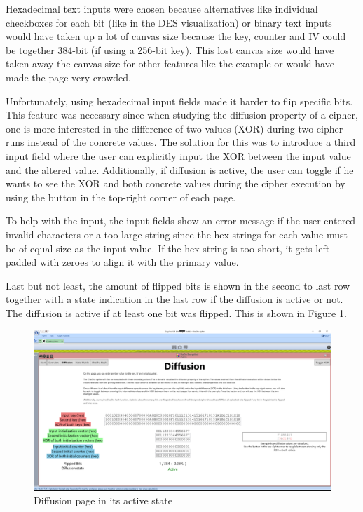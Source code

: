 Hexadecimal text inputs were chosen because alternatives like individual checkboxes for each bit (like in the DES visualization) or binary text inputs would have taken up a lot of canvas size because the key, counter and IV could be together 384-bit (if using a 256-bit key). This lost canvas size would have taken away the canvas size for other features like the example or would have made the page very crowded.

Unfortunately, using hexadecimal input fields made it harder to flip specific bits. This feature was necessary since when studying the diffusion property of a cipher, one is more interested in the difference of two values (XOR) during two cipher runs instead of the concrete values. The solution for this was to introduce a third input field where the user can explicitly input the XOR between the input value and the altered value. Additionally, if diffusion is active, the user can toggle if he wants to see the XOR and both concrete values during the cipher execution by using the button in the top-right corner of each page.

To help with the input, the input fields show an error message if the user entered invalid characters or a too large string since the hex strings for each value must be of equal size as the input value. If the hex string is too short, it gets left-padded with zeroes to align it with the primary value.

Last but not least, the amount of flipped bits is shown in the second to last row together with a state indication in the last row if the diffusion is active or not. The diffusion is active if at least one bit was flipped. This is shown in Figure \ref{fig:diffusion.active}.

\begin{figure}
\centering
\includegraphics[width=\textwidth]{figures/ct2/diffusion/diffusion-active.png}
\caption{Diffusion page in its active state}
\label{fig:diffusion.active}
\end{figure}

